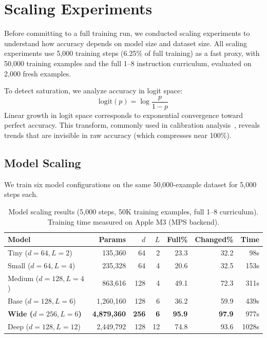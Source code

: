 \documentclass[11pt,a4paper]{article}
\begin{document}
\section{Scaling Experiments}
\label{sec:scaling}

Before committing to a full training run, we conducted scaling experiments to understand how accuracy depends on model size and dataset size.
All scaling experiments use 5{,}000 training steps (6.25\% of full training) as a fast proxy, with 50{,}000 training examples and the full 1--8 instruction curriculum, evaluated on 2{,}000 fresh examples.

To detect saturation, we analyze accuracy in logit space:
\begin{equation}
  \mathrm{logit}(p) = \log\frac{p}{1 - p}
\end{equation}
Linear growth in logit space corresponds to exponential convergence toward perfect accuracy.
This transform, commonly used in calibration analysis~\cite{guo2017calibration}, reveals trends that are invisible in raw accuracy (which compresses near 100\%).

\subsection{Model Scaling}

We train six model configurations on the same 50{,}000-example dataset for 5{,}000 steps each.

\begin{table}[h]
\centering
\caption{Model scaling results (5{,}000 steps, 50K training examples, full 1--8 curriculum). Training time measured on Apple M3 (MPS backend).}
\label{tab:model_scaling}
\begin{tabular}{lrrrrrr}
\toprule
\textbf{Model} & \textbf{Params} & $d$ & $L$ & \textbf{Full\%} & \textbf{Changed\%} & \textbf{Time} \\
\midrule
Tiny ($d{=}64, L{=}2$) & 135{,}360 & 64 & 2 & 23.3 & 32.2 & 98s \\
Small ($d{=}64, L{=}4$) & 235{,}328 & 64 & 4 & 20.6 & 32.5 & 153s \\
Medium ($d{=}128, L{=}4$) & 863{,}616 & 128 & 4 & 49.1 & 72.3 & 311s \\
Base ($d{=}128, L{=}6$) & 1{,}260{,}160 & 128 & 6 & 36.2 & 59.9 & 439s \\
\textbf{Wide ($d{=}256, L{=}6$)} & \textbf{4{,}879{,}360} & \textbf{256} & \textbf{6} & \textbf{95.9} & \textbf{97.9} & 977s \\
Deep ($d{=}128, L{=}12$) & 2{,}449{,}792 & 128 & 12 & 74.8 & 93.6 & 1028s \\
\bottomrule
\end{tabular}
\end{table}
\end{document}

